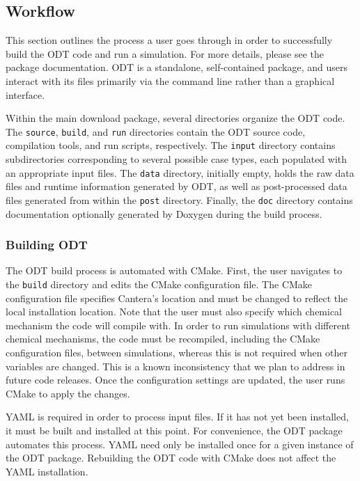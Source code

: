 \documentclass[preprint,12pt, a4paper]{elsarticle}
\begin{document}
\subsection{Workflow}
\label{sub:workflow}

This section outlines the process a user goes through in order to successfully build the ODT code and run a simulation. For more details, please see the package documentation. ODT is a standalone, self-contained package, and users interact with its files primarily via the command line rather than a graphical interface. 

Within the main download package, several directories organize the ODT code. The \texttt{source}, \texttt{build}, and \texttt{run} directories contain the ODT source code, compilation tools, and run scripts, respectively. The \texttt{input} directory contains subdirectories corresponding to several possible case types, each populated with an appropriate input files. The \texttt{data} directory, initially empty, holds the raw data files and runtime information generated by ODT, as well as post-processed data files generated from within the \texttt{post} directory. Finally, the \texttt{doc} directory contains documentation optionally generated by Doxygen \cite{vanHeesch_2018} during the build process. 

\subsubsection{Building ODT}

The ODT build process is automated with CMake. First, the user navigates to the \texttt{build} directory and edits the CMake configuration file. The CMake configuration file specifies Cantera's location and must be changed to reflect the local installation location. Note that the user must also specify which chemical mechanism the code will compile with. In order to run simulations with different chemical mechanisms, the code must be recompiled, including the CMake configuration files, between simulations, whereas this is not required when other variables are changed. This is a known inconsistency that we plan to address in future code releases. Once the configuration settings are updated, the user runs CMake to apply the changes. 

YAML is required in order to process input files. If it has not yet been installed, it must be built and installed at this point. For convenience, the ODT package automates this process. YAML need only be installed once for a given instance of the ODT package. Rebuilding the ODT code with CMake does not affect the YAML installation. 
\end{document}

